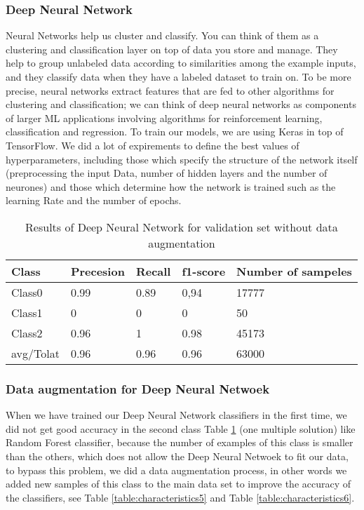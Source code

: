 \documentclass[a4paper,UKenglish]{lipics-v2016}
\begin{document}
 \subsubsection{Deep Neural Network\label{deep}}
 Neural Networks help us cluster and classify. You can think of them as a clustering and classification layer on top of data you store and manage. They help to group unlabeled data according to similarities among the example inputs, and they classify data when they have a labeled dataset to train on. To be more precise, neural networks extract features that are fed to other algorithms for clustering and classification; we can think of deep neural networks as components of larger ML applications involving algorithms for reinforcement learning, classification and regression. To train our models, we are using Keras in top of TensorFlow. We did a lot of expirements to define the best values of hyperparameters, including those which specify the structure of the network itself (preprocessing the input Data, number of hidden layers and the number of neurones) and those which determine how the network is trained such as the learning Rate and the number of epochs.

 \begin{table}
 \caption{Results of Deep Neural Network for validation set without data augmentation}
 \small
 \begin{center}
 \setlength{\tabcolsep}{0.8em}
 \renewcommand{\arraystretch}{1.5}
 \begin{tabular}{|p{1cm}|p{ 1cm}|p{1cm}|p{1.5cm}|p{1.5cm}|}
 \hline
 {Class} & {Precesion}  & {Recall} & {f1-score}& {Number of sampeles}\\
 \hline
 Class0 & 0.99 & 0.89 & 0,94 & 17777\\
 \hline
 Class1 & 0 & 0 & 0 & 50\\
 \hline
 Class2 & 0.96 & 1  & 0.98 & 45173\\
 \hline
 avg/Tolat & 0.96 & 0.96 & 0.96 & 63000\\
 \hline
 \end{tabular}
 \end{center}
 \label{table:characteristics4}
 \vspace{-5mm}
 \end{table}
 \subsubsection{Data augmentation for Deep Neural Netwoek\label{generation}}

 When we have trained our Deep Neural Network classifiers in the first time, we did not get good accuracy in the second class Table \ref{table:characteristics4} (one multiple solution) like Random Forest classifier, because the number of examples of this class is smaller than the others, which does not allow the Deep Neural Netwoek to fit our data, to bypass this problem, we did a data augmentation process, in other words we added new samples of this class to the main data set to improve the accuracy of the classifiers, see Table \ref{table:characteristics5} and Table \ref{table:characteristics6}.
\end{document}
